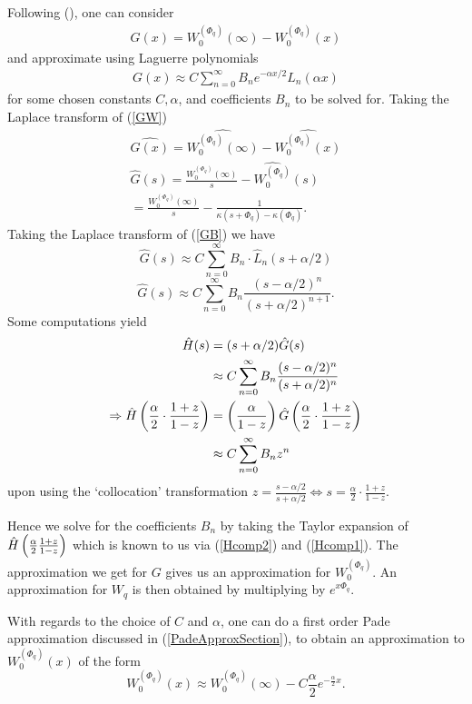Following (\cite{abate1998numerical}), one can consider
\begin{align} \label{GW}
G(x) = W^{(\Phi_q)}_0(\infty) - W^{(\Phi_q)}_0 (x)
\end{align}
and approximate using Laguerre polynomials
\begin{align} \label{GB}
G(x) \approx C \sum_{n=0}^{\infty} B_n e^{-\alpha x/2} L_n(\alpha x)
\end{align}
for some chosen constants $C, \alpha$, and coefficients $B_n$ to be solved for. Taking the Laplace transform of (\ref{GW})
\begin{align}
\widehat{G (x)} = \widehat{W^{(\Phi_q)}_0(\infty)} - \widehat{W^{(\Phi_q)}_0 (x)} \nonumber \\
\hat{G}(s)= \frac{W^{(\Phi_q)}_0(\infty)}{s} - \widehat{W^{(\Phi_q)}_0} (s) \nonumber \\
=  \frac{W^{(\Phi_q)}_0(\infty)}{s} - \frac{1}{\kappa(s + \Phi_q) - \kappa(\Phi_q)}. \label{Hcomp1}
\end{align}
Taking the Laplace transform of (\ref{GB}) we have
\[
\hat{G}(s) \approx C \sum_{n=0}^{\infty} B_n \cdot \hat{L}_n(s+\alpha / 2) 
\]
\[
\hat{G}(s) \approx C \sum_{n=0}^{\infty} B_n \frac{(s - \alpha / 2)^n}{ (s+\alpha/2)^{n+1}}.
\]
Some computations yield
\begin{align}
\hat{H}(s) &= (s+\alpha/2) \hat{G}(s) \nonumber \\
& \approx C \sum_{n=0}^{\infty} B_n \frac{(s - \alpha / 2)^n}{ (s+\alpha/2)^{n}} \nonumber \\
\Rightarrow \hat{H} \left( \frac{\alpha}{2} \cdot \frac{1+z}{1-z} \right) &= \left( \frac{\alpha}{1-z} \right) \hat{G} \left( \frac{\alpha}{2} \cdot \frac{1+z}{1-z} \right) \label{Hcomp2} \\
&\approx C \sum_{n=0}^{\infty} B_n z^n \nonumber
\end{align}
upon using the `collocation' transformation $z = \frac{s - \alpha/2}{s + \alpha/2} \iff s = \frac{\alpha}{2} \cdot \frac{1+z}{1-z}$.

Hence we solve for the coefficients $B_n$ by taking the Taylor expansion of $\hat{H} \left( \frac{\alpha}{2} \frac{1+z}{1-z} \right)$ which is known to us via (\ref{Hcomp2}) and (\ref{Hcomp1}). The approximation we get for $G$ gives us an approximation for $ W^{(\Phi_q)}_0$. An approximation for $W_q$ is then obtained by multiplying by $e^{x \Phi_q}$.

With regards to the choice of $C$ and $\alpha$, one can do a first order Pade approximation discussed in (\ref{PadeApproxSection}), to obtain an approximation to $W^{(\Phi_q)}_0 (x)$ of the form
\[
W^{(\Phi_q)}_0 (x) \approx W^{(\Phi_q)}_0 (\infty) - C \frac{\alpha}{2} e^{-\frac{\alpha}{2}x}.
\]

